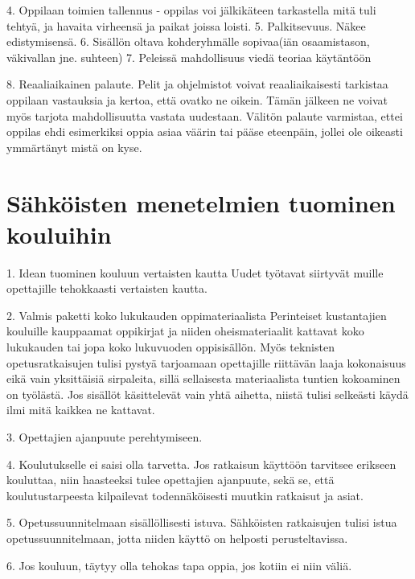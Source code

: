 \documentclass[utf8,bachelor]{gradu3}
\begin{document}
4. Oppilaan toimien tallennus - oppilas voi jälkikäteen tarkastella mitä tuli tehtyä, ja havaita virheensä ja paikat joissa loisti.
5. Palkitsevuus. Näkee edistymisensä.
6. Sisällön oltava kohderyhmälle sopivaa(iän osaamistason, väkivallan jne. suhteen) 
7. Peleissä mahdollisuus viedä teoriaa käytäntöön

8. Reaaliaikainen palaute.
Pelit ja ohjelmistot voivat reaaliaikaisesti tarkistaa oppilaan vastauksia ja kertoa, että ovatko ne oikein. Tämän jälkeen ne voivat myös tarjota mahdollisuutta vastata uudestaan. Välitön palaute varmistaa, ettei oppilas ehdi esimerkiksi oppia asiaa väärin tai pääse eteenpäin, jollei ole oikeasti ymmärtänyt mistä on kyse.

\section{Sähköisten menetelmien tuominen kouluihin}
1. Idean tuominen kouluun vertaisten kautta
Uudet työtavat siirtyvät muille opettajille tehokkaasti vertaisten kautta. \parencite[][]{koulunArki}

2. Valmis paketti koko lukukauden oppimateriaalista
Perinteiset kustantajien kouluille kauppaamat oppikirjat ja niiden oheismateriaalit kattavat koko lukukauden tai jopa koko lukuvuoden oppisisällön. Myös teknisten opetusratkaisujen tulisi pystyä tarjoamaan opettajille riittävän laaja kokonaisuus eikä vain yksittäisiä sirpaleita, sillä sellaisesta materiaalista tuntien kokoaminen on työlästä. Jos sisällöt käsittelevät vain yhtä aihetta, niistä tulisi selkeästi käydä ilmi mitä kaikkea ne kattavat.

3. Opettajien ajanpuute perehtymiseen.

4. Koulutukselle ei saisi olla tarvetta.
Jos ratkaisun käyttöön tarvitsee erikseen kouluttaa, niin haasteeksi tulee opettajien ajanpuute, sekä se, että koulutustarpeesta kilpailevat todennäköisesti muutkin ratkaisut ja asiat.

5. Opetussuunnitelmaan sisällöllisesti istuva.
Sähköisten ratkaisujen tulisi istua opetussuunnitelmaan, jotta niiden käyttö on helposti perusteltavissa.

6. Jos kouluun, täytyy olla tehokas tapa oppia, jos kotiin ei niin väliä.
\end{document}
